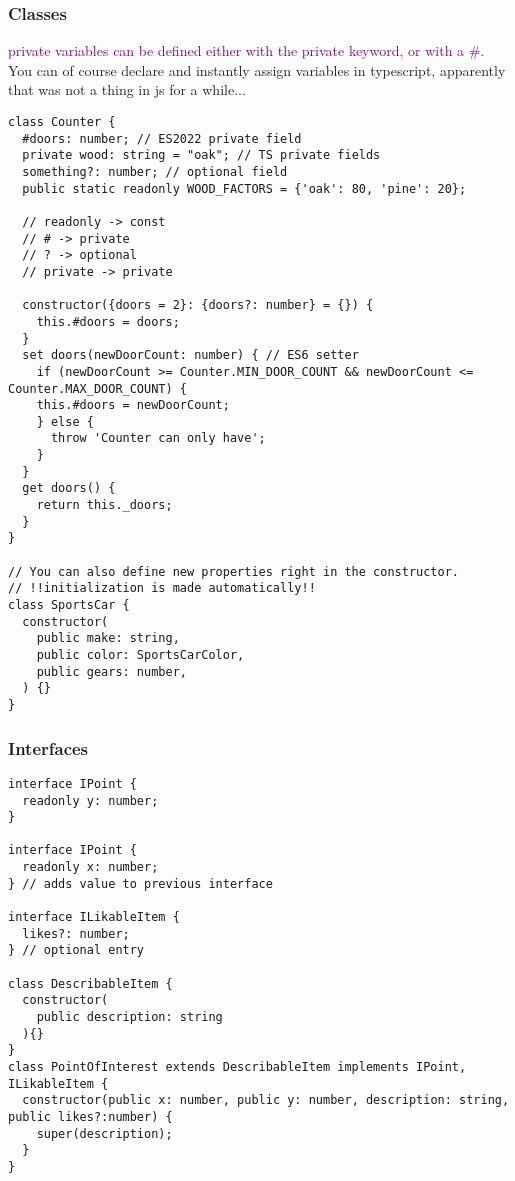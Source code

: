 \documentclass[main.tex,fontsize=8pt,paper=a4,paper=portrait,DIV=calc,]{scrartcl}
\begin{document}
\subsubsection{Classes}
\textcolor{purple}{private variables can be defined either with the private keyword, or with a \#.}\newline
You can of course declare and instantly assign variables in typescript, apparently that was not a thing in js for a while...
\begin{lstlisting}
class Counter {
  #doors: number; // ES2022 private field
  private wood: string = "oak"; // TS private fields
  something?: number; // optional field
  public static readonly WOOD_FACTORS = {'oak': 80, 'pine': 20};

  // readonly -> const
  // # -> private
  // ? -> optional
  // private -> private
  
  constructor({doors = 2}: {doors?: number} = {}) {
    this.#doors = doors;
  }
  set doors(newDoorCount: number) { // ES6 setter
    if (newDoorCount >= Counter.MIN_DOOR_COUNT && newDoorCount <= Counter.MAX_DOOR_COUNT) {
    this.#doors = newDoorCount;
    } else {
      throw 'Counter can only have';
    }
  }
  get doors() {
    return this._doors;
  }
}

// You can also define new properties right in the constructor. 
// !!initialization is made automatically!!
class SportsCar {
  constructor(
    public make: string,
    public color: SportsCarColor,
    public gears: number,
  ) {}
}
\end{lstlisting}

\subsubsection{Interfaces}
\begin{lstlisting}
interface IPoint {
  readonly y: number;
} 

interface IPoint {
  readonly x: number;
} // adds value to previous interface

interface ILikableItem {
  likes?: number;
} // optional entry

class DescribableItem {
  constructor(
    public description: string
  ){}
} 
class PointOfInterest extends DescribableItem implements IPoint, ILikableItem {
  constructor(public x: number, public y: number, description: string, public likes?:number) {
    super(description);
  }
}
\end{lstlisting}


\lstset{
    language=CSS,
    style=code,
}

\lstset{
    language=HTML,
    style=code,
}
\end{document}
